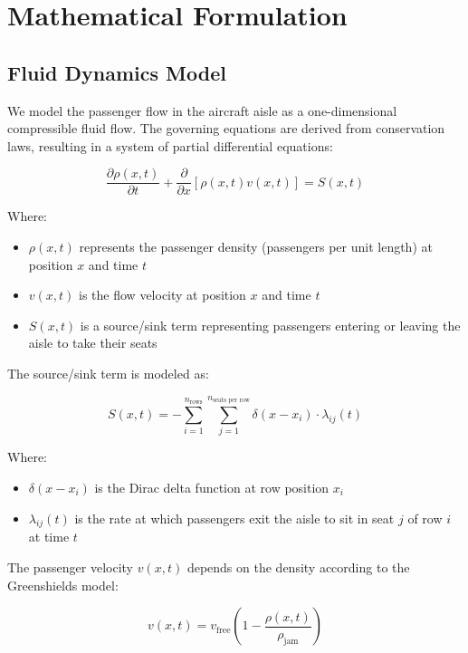 \documentclass[a4paper,12pt]{article}
\begin{document}
\section{Mathematical Formulation}
\subsection{Fluid Dynamics Model}

We model the passenger flow in the aircraft aisle as a one-dimensional compressible fluid flow. The governing equations are derived from conservation laws, resulting in a system of partial differential equations:

\begin{equation}
\frac{\partial \rho(x,t)}{\partial t} + \frac{\partial}{\partial x}[\rho(x,t)v(x,t)] = S(x,t)
\end{equation}

Where:
\begin{itemize}
    \item $\rho(x,t)$ represents the passenger density (passengers per unit length) at position $x$ and time $t$
    \item $v(x,t)$ is the flow velocity at position $x$ and time $t$
    \item $S(x,t)$ is a source/sink term representing passengers entering or leaving the aisle to take their seats
\end{itemize}

The source/sink term is modeled as:

\begin{equation}
S(x,t) = -\sum_{i=1}^{n_{\text{rows}}} \sum_{j=1}^{n_{\text{seats per row}}} \delta(x - x_i) \cdot \lambda_{ij}(t)
\end{equation}

Where:
\begin{itemize}
    \item $\delta(x - x_i)$ is the Dirac delta function at row position $x_i$
    \item $\lambda_{ij}(t)$ is the rate at which passengers exit the aisle to sit in seat $j$ of row $i$ at time $t$
\end{itemize}

The passenger velocity $v(x,t)$ depends on the density according to the Greenshields model:

\begin{equation}
v(x,t) = v_{\text{free}} \left(1 - \frac{\rho(x,t)}{\rho_{\text{jam}}}\right)
\end{equation}
\end{document}
